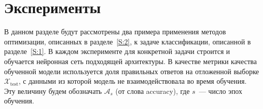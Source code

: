 \documentclass[preprint,12pt]{elsarticle}
\begin{document}



\section{Эксперименты}
\label{S:3}
В данном разделе будут рассмотрены два примера применения методов оптимизации, описанных в разделе~\ref{S:2}, к задаче классификации, описанной в разделе~\ref{S:1}. В каждом эксперименте для конкретной задачи строится и обучается нейронная сеть подходящей архитектуры. В качестве метрики качества обученной модели используется доля правильных ответов на отложенной выборке $\mathcal{X}_\text{test}$, с данными из которой модель не взаимодействовала во время обучения. Эту величину будем обозначать $\mathcal{A}_s$ (от слова accuracy), где $s$~--- число эпох обучения.
\end{document}
